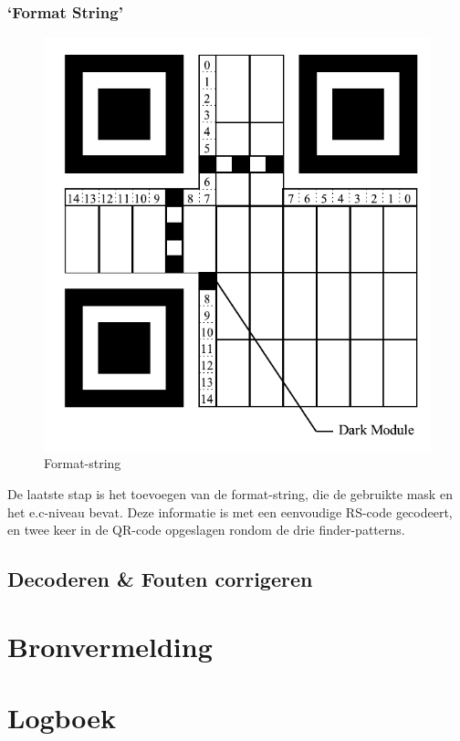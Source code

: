 \documentclass{article}
\begin{document}
\subsubsection{`Format String'}
\begin{figure}[h]
\centering
\includegraphics[width=0.5\linewidth]{format-string.pdf}
\caption{Format-string}
\label{fig:format-string}
\end{figure}

De laatste stap is het toevoegen van de format-string, die de gebruikte mask en het e.c-niveau bevat. Deze informatie is met een eenvoudige RS-code gecodeert, en twee keer in de QR-code opgeslagen rondom de drie finder-patterns.

\subsection{Decoderen \& Fouten corrigeren}
\section{Bronvermelding}
\section{Logboek}
\end{document}
